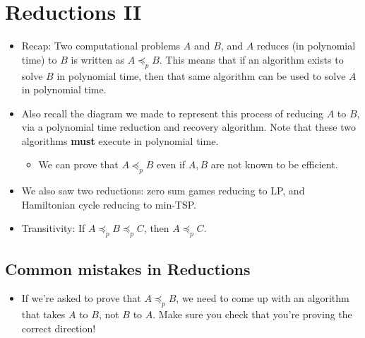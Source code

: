 \section{Reductions II}
\begin{itemize}
	\item Recap: Two computational problems \(A\) and \(B\), and \(A\) reduces (in polynomial time) to \(B\) 
		is written as \(A \preceq_p B\). This means that if an algorithm exists to solve \(B\) in polynomial 
		time, then that same algorithm can be used to solve \(A \) in polynomial time. 

		
	\item Also recall the diagram we made to represent this process of reducing \(A\) to \(B\), via 
		a polynomial time reduction and recovery algorithm. Note that these two algorithms \textbf{must} execute
		in polynomial time. 
		\begin{itemize}
			\item We can prove that \(A \preceq_p B\) even if \(A, B\) are not known to be efficient.
		\end{itemize}
	\item We also saw two reductions: zero sum games reducing to LP, and Hamiltonian cycle reducing to min-TSP.
	\item Transitivity: If \(A \preceq_p B \preceq_p C\), then \(A \preceq_p C\). 
\end{itemize}
\subsection{Common mistakes in Reductions}
\begin{itemize}
	\item If we're asked to prove that \(A \preceq_p B\), we need to come up with an algorithm that takes
		\(A\) to \(B\), not \(B\) to \(A\). Make sure you check that you're proving the correct direction!
\end{itemize}
